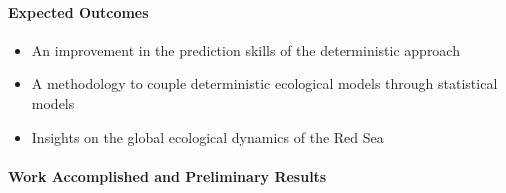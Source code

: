 \paragraph{Expected Outcomes}

\begin{itemize}
\item An improvement in the prediction skills of the deterministic approach
\item A methodology to couple deterministic ecological models through statistical models
\item Insights on the global ecological dynamics of the Red Sea
\end{itemize}

\paragraph{Work Accomplished and Preliminary Results}


